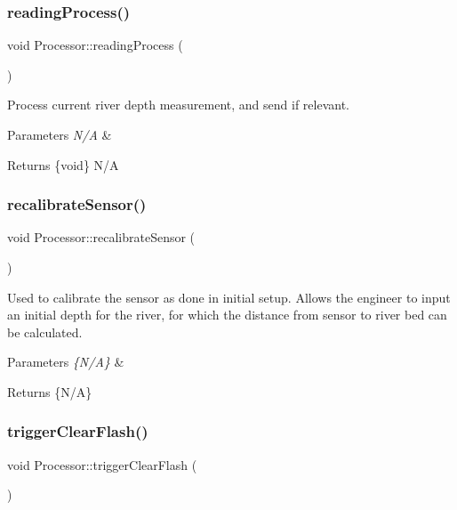 \subsubsection{\texorpdfstring{reading\+Process()}{readingProcess()}}
{\footnotesize\ttfamily void Processor\+::reading\+Process (\begin{DoxyParamCaption}{ }\end{DoxyParamCaption})}

Process current river depth measurement, and send if relevant. 
\begin{DoxyParams}{Parameters}
{\em N/A} & \\
\hline
\end{DoxyParams}
\begin{DoxyReturn}{Returns}
\{void\} N/A 
\end{DoxyReturn}
\mbox{\label{class_processor_ae18acf2c55d0a3bcd7412f86d388808d}} 
\subsubsection{\texorpdfstring{recalibrate\+Sensor()}{recalibrateSensor()}}
{\footnotesize\ttfamily void Processor\+::recalibrate\+Sensor (\begin{DoxyParamCaption}{ }\end{DoxyParamCaption})}

Used to calibrate the sensor as done in initial setup. Allows the engineer to input an initial depth for the river, for which the distance from sensor to river bed can be calculated.


\begin{DoxyParams}{Parameters}
{\em \{\+N/\+A\}} & \\
\hline
\end{DoxyParams}
\begin{DoxyReturn}{Returns}
\{N/A\} 
\end{DoxyReturn}
\mbox{\label{class_processor_a8083069e032fcd6e38c97cc31475200a}} 
\subsubsection{\texorpdfstring{trigger\+Clear\+Flash()}{triggerClearFlash()}}
{\footnotesize\ttfamily void Processor\+::trigger\+Clear\+Flash (\begin{DoxyParamCaption}{ }\end{DoxyParamCaption})}

